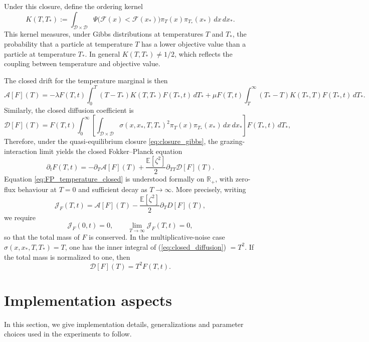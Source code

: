 \documentclass[10pt,a4paper]{article}
\theoremstyle{theorem}
\numberwithin{equation}{section}
\begin{document}
Under this closure, define the ordering kernel
\begin{equation}
\label{eq:ordering_kernel}
K(T,T_*)
:=
\int_{\mathcal D\times\mathcal D}
\Psi\big(\mathcal F(x)<\mathcal F(x_*)\big)
\pi_T(x)\pi_{T_*}(x_*)\,dx\,dx_* .
\end{equation}
This kernel measures, under Gibbs distributions at temperatures \(T\) and
\(T_*\), the probability that a particle at temperature \(T\) has a lower
objective value than a particle at temperature \(T_*\). In general
\(K(T,T_*)\neq 1/2\), which reflects the coupling between temperature and
objective value.

The closed drift for the temperature marginal is then
\begin{equation}
\label{eq:closed_drift}
\mathcal A[F](T)
=
-\lambda F(T,t)\int_0^T
(T-T_*)K(T,T_*)F(T_*,t)\,dT_*
+
\mu F(T,t)\int_T^\infty
(T_*-T)K(T_*,T)F(T_*,t)\,dT_* .
\end{equation}
Similarly, the closed diffusion coefficient is
\begin{equation}
\label{eq:closed_diffusion}
\mathcal D[F](T)
=
F(T,t)
\int_0^\infty\left[
\int_{\mathcal D\times\mathcal D}
\sigma(x,x_*,T,T_*)^2
\pi_T(x)\pi_{T_*}(x_*)\,dx\,dx_* \right]
F(T_*,t)\,dT_*,
\end{equation}
Therefore, under the quasi-equilibrium closure \eqref{eq:closure_gibbs}, the
grazing-interaction limit yields the closed Fokker--Planck equation
\begin{equation}
\label{eq:FP_temperature_closed}
\partial_t F(T,t)
=
-\partial_T\mathcal A[F](T)
+
\frac{\mathbb E[\zeta^2]}{2}
\partial_{TT}\mathcal D[F](T).
\end{equation}
Equation \eqref{eq:FP_temperature_closed} is understood formally on
\(\mathbb{R}_+\), with zero-flux behaviour at \(T=0\) and sufficient decay as \(T\to\infty\). More precisely, writing
\begin{equation*}
\mathcal J_F(T,t)=\mathcal{A}[F](T)-\frac{\mathbb{E}[\zeta^2]}{2}\partial_TD[F](T),
\end{equation*}
we require
\begin{equation*}
\mathcal J_F(0,t)=0,
\qquad
\lim_{T\to\infty}\mathcal J_F(T,t)=0,
\end{equation*}
so that the total mass of \(F\) is conserved. In the multiplicative-noise case \(\sigma(x,x_*,T,T_*)=T\), one has the inner integral of (\ref{eq:closed_diffusion}) $=T^2$. If the total mass is normalized to one, then
\[
\mathcal D[F](T)=T^2F(T,t).
\]

\section{Implementation aspects}
\label{sec:impl}
In this section, we give implementation details, generalizations and parameter choices used in the experiments to follow.
\end{document}
